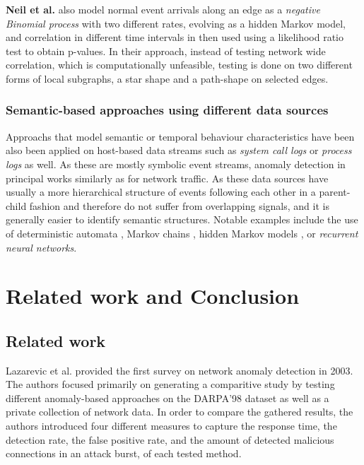 \documentclass[a4paper,12pt,twoside]{report}
\begin{document}
\textbf{Neil et al.}  \cite{neil2013scan} also model normal event arrivals along an edge as a \textit{negative Binomial process} with two different rates, evolving as a hidden Markov model, and correlation in different time intervals in then used  using a likelihood ratio test to obtain p-values. In their approach, instead of testing network wide correlation, which is computationally unfeasible, testing is done on two different forms of local subgraphs, a star shape and a path-shape on selected edges. 


\subsection{Semantic-based approaches using different data sources}

Approachs that model semantic or temporal behaviour characteristics have been also been applied on host-based data streams such as \textit{system call logs} or \textit{process logs} as well. As these are mostly symbolic event streams, anomaly detection in principal works similarly as for network traffic. As these data sources have usually a more hierarchical structure of events following each other in a parent-child fashion and therefore do not suffer from overlapping signals, and it is generally easier to identify semantic structures. Notable examples include the use of deterministic automata \cite{warrender1999detecting}, Markov chains \cite{ye2000markov}, hidden Markov models \cite{yeung2003host,hu2009simple}, or \textit{recurrent neural networks}\cite{du2017deeplog}.


\chapter{Related work and Conclusion}

\section{Related work}

Lazarevic et al. \cite{lazarevic_comparative_2003} provided the first survey on network anomaly detection in 2003. The authors focused primarily on generating a comparitive study by testing different anomaly-based approaches on the DARPA'98 dataset as well as a private collection of network data. In order to compare the gathered results, the authors introduced four different measures to capture the response time, the detection rate, the false positive rate, and the amount of detected malicious connections in an attack burst, of each tested method. 
\end{document}
